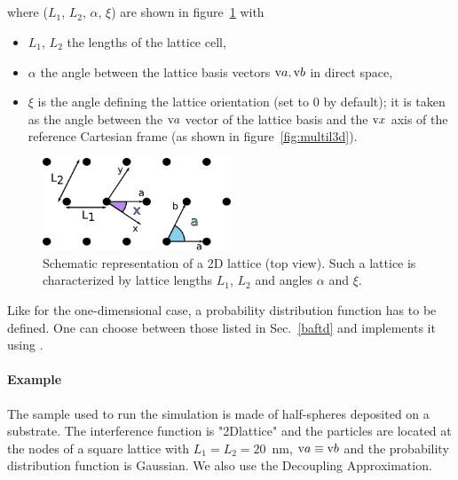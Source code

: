 \FloatBarrier

\newpage
\subsection{}
where ($L_1$, $L_2$, $\alpha$, $\xi$) are shown in figure~\ref{fig:2dlattice} with
\begin{itemize}
\item[]$L_1$, $L_2$ the lengths of the lattice cell,
\item[]$\alpha$ the angle between the lattice basis vectors $\text{v}{a}, \text{v}{b}$ in direct space,
\item[] $\xi$ is the angle defining the lattice orientation (set to $0$ by default); it is taken as the angle between the $\text{v}{a}$ vector of the lattice basis and the $\text{v}{x}$ axis of the reference Cartesian frame (as shown in figure~\ref{fig:multil3d}).
\end{itemize}

\begin{figure}[tb]
\begin{center}
\includegraphics[width=0.5\textwidth]{fig/drawing/2Dlattice.pdf}
\end{center}
\caption{Schematic representation of a 2D lattice (top view). Such a lattice is characterized by lattice lengths $L_1$, $L_2$ and angles $\alpha$ and $\xi$.}
\label{fig:2dlattice}
\end{figure}

Like for the one-dimensional case, a probability distribution function  has to be defined. One can choose between those listed in Sec.~\ref{baftd} and implements it using .

\paragraph{Example} The sample used to run the simulation is made of half-spheres deposited on a substrate. The interference function is "2Dlattice" and the particles are located at the nodes of a square lattice with $L_1=L_2=20$~nm, $\text{v}{a}\equiv \text{v}{b}$ and the probability distribution function is Gaussian. We also use the Decoupling Approximation.


